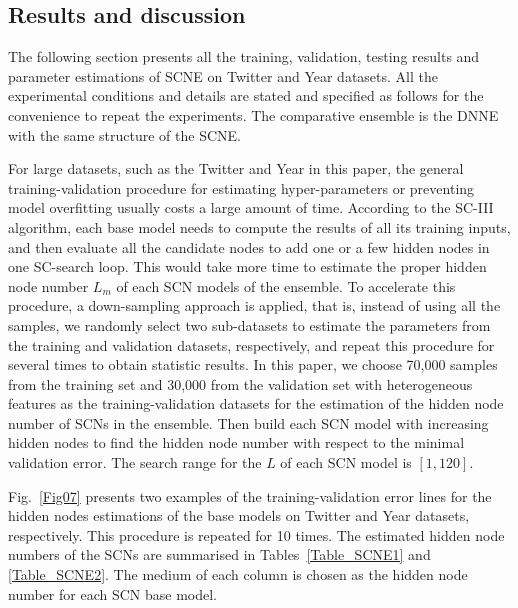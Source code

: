 \documentclass{article}
\begin{document}
\subsection{Results and discussion}
The following section presents all the training, validation, testing results and parameter estimations of SCNE on Twitter and Year datasets. 
All the experimental conditions and details are stated and specified as follows for the convenience to repeat the experiments.
The comparative ensemble is the DNNE with the same structure of the SCNE.

For large datasets, such as the Twitter and Year in this paper, the general training-validation procedure for estimating hyper-parameters or preventing model overfitting usually costs a large amount of time. 
According to the SC-III algorithm, each base model needs to compute the results of all its training inputs, and then evaluate all the candidate nodes to add one or a few hidden nodes in one SC-search loop. 
This would take more time to estimate the proper hidden node number $L_m$ of each SCN models of the ensemble.
To accelerate this procedure, a down-sampling approach is applied, that is, instead of using all the samples, we randomly select two sub-datasets to estimate the parameters from the training and validation datasets, respectively,  and repeat this procedure for several times to obtain statistic results.
In this paper, we choose 70,000 samples from the training set and 30,000 from the validation set with heterogeneous features as the training-validation datasets for the estimation of the hidden node number of SCNs in the ensemble. 
Then build each SCN model with increasing hidden nodes to find the hidden node number with respect to the minimal validation error.
The search range for the $L$  of each SCN model is $[1, 120]$. 

Fig.~\ref{Fig07} presents two examples of the training-validation error lines for the hidden nodes estimations of the base models on Twitter and Year datasets, respectively. This procedure is repeated for 10 times. The estimated hidden node numbers of the SCNs are summarised in Tables~\ref{Table_SCNE1} and \ref{Table_SCNE2}. The medium of each column is chosen as the hidden node number for each SCN base model.
\end{document}
